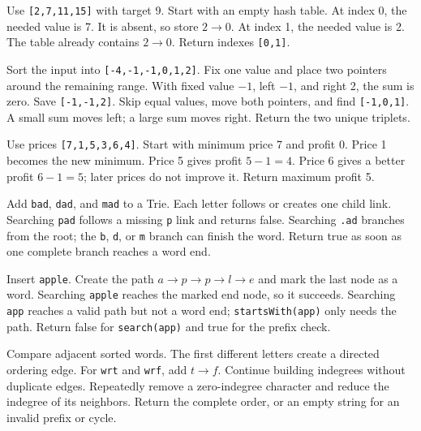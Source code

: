 
\expandafter\def\csname lessontrace@1\endcsname{\visualtrace
  {Use \texttt{[2,7,11,15]} with target 9. Start with an empty hash table.}
  {At index 0, the needed value is 7. It is absent, so store \(2\to0\).}
  {At index 1, the needed value is 2. The table already contains \(2\to0\).}
  {Return indexes \texttt{[0,1]}.}}

\expandafter\def\csname lessontrace@2\endcsname{\visualtrace
  {Sort the input into \texttt{[-4,-1,-1,0,1,2]}. Fix one value and place two pointers around the remaining range.}
  {With fixed value \(-1\), left \(-1\), and right 2, the sum is zero. Save \texttt{[-1,-1,2]}.}
  {Skip equal values, move both pointers, and find \texttt{[-1,0,1]}. A small sum moves left; a large sum moves right.}
  {Return the two unique triplets.}}

\expandafter\def\csname lessontrace@3\endcsname{\visualtrace
  {Use prices \texttt{[7,1,5,3,6,4]}. Start with minimum price 7 and profit 0.}
  {Price 1 becomes the new minimum. Price 5 gives profit \(5-1=4\).}
  {Price 6 gives a better profit \(6-1=5\); later prices do not improve it.}
  {Return maximum profit 5.}}

\expandafter\def\csname lessontrace@4\endcsname{\visualtrace
  {Add \texttt{bad}, \texttt{dad}, and \texttt{mad} to a Trie. Each letter follows or creates one child link.}
  {Searching \texttt{pad} follows a missing \texttt{p} link and returns false.}
  {Searching \texttt{.ad} branches from the root; the \texttt{b}, \texttt{d}, or \texttt{m} branch can finish the word.}
  {Return true as soon as one complete branch reaches a word end.}}

\expandafter\def\csname lessontrace@5\endcsname{\visualtrace
  {Insert \texttt{apple}. Create the path \(a\to p\to p\to l\to e\) and mark the last node as a word.}
  {Searching \texttt{apple} reaches the marked end node, so it succeeds.}
  {Searching \texttt{app} reaches a valid path but not a word end; \texttt{startsWith(app)} only needs the path.}
  {Return false for \texttt{search(app)} and true for the prefix check.}}

\expandafter\def\csname lessontrace@6\endcsname{\visualtrace
  {Compare adjacent sorted words. The first different letters create a directed ordering edge.}
  {For \texttt{wrt} and \texttt{wrf}, add \(t\to f\). Continue building indegrees without duplicate edges.}
  {Repeatedly remove a zero-indegree character and reduce the indegree of its neighbors.}
  {Return the complete order, or an empty string for an invalid prefix or cycle.}}


